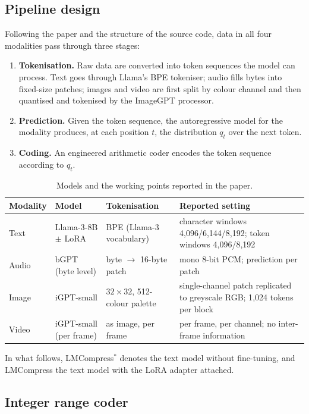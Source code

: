 \documentclass[12pt,a4paper]{article}
\newcommand{\qt}{q_t}
\begin{document}
\subsection{Pipeline design}

Following the paper and the structure of the source code, data in all four modalities pass
through three stages:

\begin{enumerate}[label=\arabic*.,leftmargin=*]
  \item \textbf{Tokenisation.} Raw data are converted into token sequences the model can
        process. Text goes through Llama's BPE tokeniser; audio fills bytes into fixed-size
        patches; images and video are first split by colour channel and then quantised and
        tokenised by the ImageGPT processor.
  \item \textbf{Prediction.} Given the token sequence, the autoregressive model for the
        modality produces, at each position $t$, the distribution $\qt$ over the next token.
  \item \textbf{Coding.} An engineered arithmetic coder encodes the token sequence according
        to $\qt$.
\end{enumerate}

\begin{table}[htbp]\centering\small
\caption{Models and the working points reported in the paper.}
\begin{tabular}{@{}llll@{}}
\toprule
Modality & Model & Tokenisation & Reported setting \\
\midrule
Text & Llama-3-8B $\pm$ LoRA & BPE (Llama-3 vocabulary) & character windows 4{,}096/6{,}144/8{,}192; token windows 4{,}096/8{,}192 \\
Audio & bGPT (byte level) & byte $\rightarrow$ 16-byte patch & mono 8-bit PCM; prediction per patch \\
Image & iGPT-small & $32\times32$, 512-colour palette & single-channel patch replicated to greyscale RGB; 1{,}024 tokens per block \\
Video & iGPT-small (per frame) & as image, per frame & per frame, per channel; no inter-frame information \\
\bottomrule
\end{tabular}
\end{table}

In what follows, LMCompress$^{*}$ denotes the text model without fine-tuning, and
LMCompress the text model with the LoRA adapter attached.

\subsection{Integer range coder}
\end{document}
